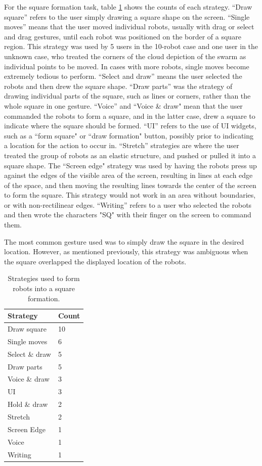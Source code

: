 For the square formation task, table \ref{tab:square_strategies} shows the counts of each strategy. 
``Draw square'' refers to the user simply drawing a square shape on the screen. 
``Single moves'' means that the user moved individual robots, usually with drag or select and drag gestures, until each robot was positioned on the border of a square region. 
This strategy was used by 5 users in the 10-robot case and one user in the unknown case, who treated the corners of the cloud depiction of the swarm as individual points to be moved. 
In cases with more robots, single moves become extremely tedious to perform. 
``Select and draw'' means the user selected the robots and then drew the square shape. 
``Draw parts'' was the strategy of drawing individual parts of the square, such as lines or corners, rather than the whole square in one gesture. 
``Voice'' and ``Voice \& draw" mean that the user commanded the robots to form a square, and in the latter case, drew a square to indicate where the square should be formed.
``UI'' refers to the use of UI widgets, such as a ``form square" or ``draw formation" button, possibly prior to indicating a location for the action to occur in. 
``Stretch'' strategies are where the user treated the group of robots as an elastic structure, and pushed or pulled it into a square shape.
The ``Screen edge" strategy was used by having the robots press up against the edges of the visible area of the screen, resulting in lines at each edge of the space, and then moving the resulting lines towards the center of the screen to form the square. 
This strategy would not work in an area without boundaries, or with non-rectilinear edges. 
``Writing'' refers to a user who selected the robots and then wrote the characters "SQ" with their finger on the screen to command them. 

The most common gesture used was to simply draw the square in the desired location. 
However, as mentioned previously, this strategy was ambiguous when the square overlapped the displayed location of the robots.

\begin{table}
	\begin{tabular}{l l}
		Strategy & Count\\
		\hline
		Draw square & 10\\
		Single moves & 6\\
		Select \& draw & 5\\
		Draw parts & 5 \\
		Voice \& draw & 3\\
		UI & 3\\
		Hold \& draw & 2\\
		Stretch & 2\\
		Screen Edge & 1\\
		Voice & 1\\
		Writing & 1\\
	\end{tabular}
	\caption{Strategies used to form robots into a square formation.}
	\label{tab:square_strategies}
\end{table}

